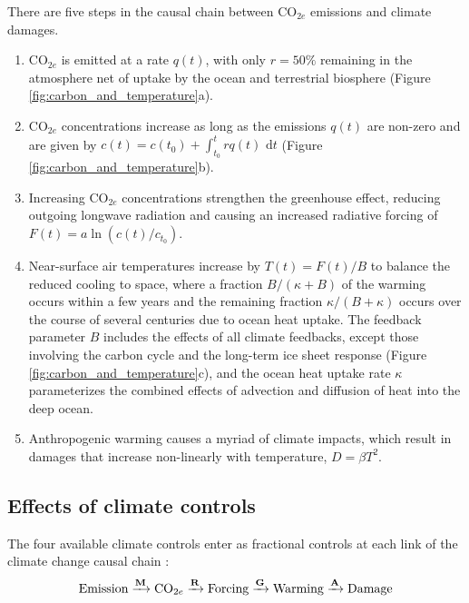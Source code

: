 \documentclass[9pt,twocolumn,twoside,lineno]{pnas-new}
\begin{document}
There are five steps in the causal chain between CO$_{2e}$ emissions and climate damages.
\begin{enumerate}
    \item CO$_{2e}$ is emitted at a rate $q(t)$, with only $r = 50\%$ remaining in the atmosphere net of uptake by the ocean and terrestrial biosphere (Figure \ref{fig:carbon_and_temperature}a).
    \item CO$_{2e}$ concentrations increase as long as the emissions $q(t)$ are non-zero and are given by $c(t) = c(t_{0}) + \int_{t_{0}}^{t} rq(t)\text{ d}t$ (Figure \ref{fig:carbon_and_temperature}b).
    \item Increasing CO$_{2e}$ concentrations strengthen the greenhouse effect, reducing outgoing longwave radiation and causing an increased radiative forcing of $F(t) = a \ln(c(t)/c_{t_{0}})$. 
    \item Near-surface air temperatures increase by $T(t) = F(t)/B$ to balance the reduced cooling to space, where a fraction $B/(\kappa + B)$ of the warming occurs within a few years and the remaining fraction $\kappa/(B + \kappa)$ occurs over the course of several centuries due to ocean heat uptake. The feedback parameter $B$ includes the effects of all climate feedbacks, except those involving the carbon cycle and the long-term ice sheet response (Figure \ref{fig:carbon_and_temperature}c), and the ocean heat uptake rate $\kappa$ parameterizes the combined effects of advection and diffusion of heat into the deep ocean.
    \item Anthropogenic warming causes a myriad of climate impacts, which result in damages that increase non-linearly with temperature, $D = \beta T^{2}$.
\end{enumerate} 

\subsection*{Effects of climate controls}

The four available climate controls enter as fractional controls at each link of the climate change causal chain \cite[similar to][]{Moreno}:
\begin{equation}
    \text{Emission}
    \xrightarrow{\text{\textbf{M}}}
    \text{CO$_{2e}$}
    \xrightarrow{\text{\textbf{R}}}
    \text{Forcing}
    \xrightarrow{\text{\textbf{G}}}
    \text{Warming}
    \xrightarrow{\text{\textbf{A}}}
    \text{Damage}
\end{equation}
\end{document}
